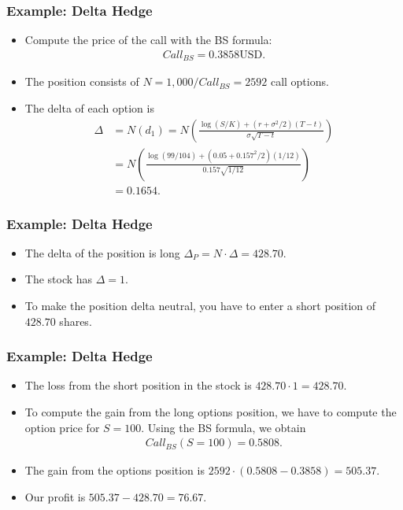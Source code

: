 \begin{frame}[fragile]
\frametitle{Example: Delta Hedge}
\begin{itemize}
  \item Compute the price of the call with the BS formula:
  \begin{align*}
    Call_{BS} = 0.3858 \text{USD}.
  \end{align*}
  \item The position consists of $N=1,000/Call_{BS}=2592$ call options.
  \item The delta of each option is
  \begin{align*}
    \Delta &= N(d_1) =N(\frac{\log \left( S/K \right) + (r+\sigma^2/2)(T-t)
    }{\sigma\sqrt{T-t}}) \\
    	&= N(\frac{\log \left( 99/104 \right) + (0.05+0.157^2/2)(1/12)
    }{0.157\sqrt{1/12}})\\
     	&= 0.1654.
  \end{align*}
\end{itemize}
\end{frame}


\begin{frame}[fragile]
\frametitle{Example: Delta Hedge}
\begin{itemize}
  \item The delta of the position is long $\Delta_P=N\cdot \Delta=428.70$.
  \item The stock has $\Delta=1$.
  \item To make the position delta neutral, you have to enter a short position
  of $428.70$ shares.
\end{itemize}
\end{frame}

\begin{frame}[fragile]
\frametitle{Example: Delta Hedge}
\begin{itemize}
  \item The loss from the short position in the stock is $428.70 \cdot
  1=428.70$.
  \item To compute the gain from the long options position, we have to compute
  the option price for $S=100$. Using the BS formula, we obtain
  \begin{align*}
    Call_{BS}(S=100) = 0.5808.
  \end{align*}
  \item The gain from the options position is $2592\cdot(0.5808-0.3858)=505.37$.
  \item Our profit is $505.37-428.70=76.67$.
\end{itemize}
\end{frame}

